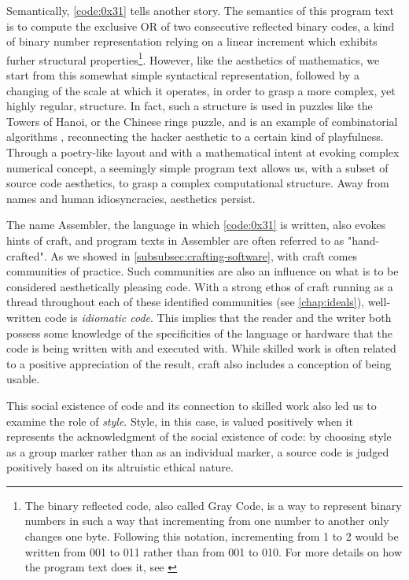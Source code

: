 Semantically, \ref{code:0x31} tells another story. The semantics of this program text is to compute the exclusive OR of two consecutive reflected binary codes, a kind of binary number representation relying on a linear increment which exhibits furher structural properties\footnote{The binary reflected code, also called Gray Code, is a way to represent binary numbers in such a way that incrementing from one number to another only changes one byte. Following this notation, incrementing from 1 to 2 would be written from 001 to 011 rather than from 001 to 010. For more details on how the program text does it, see \citep{sanchez_solutions_2016}}. However, like the aesthetics of mathematics, we start from this somewhat simple syntactical representation, followed by a changing of the scale at which it operates, in order to grasp a more complex, yet highly regular, structure. In fact, such a structure is used in puzzles like the Towers of Hanoi, or the Chinese rings puzzle, and is an example of combinatorial algorithms \citep{knuth_art_2011}, reconnecting the hacker aesthetic to a certain kind of playfulness. Through a poetry-like layout and with a mathematical intent at evoking complex numerical concept, a seemingly simple program text allows us, with a subset of source code aesthetics, to grasp a complex computational structure. Away from names and human idiosyncracies, aesthetics persist.

The name Assembler, the language in which \ref{code:0x31} is written, also evokes hints of craft, and program texts in Assembler are often referred to as "hand-crafted". As we showed in \ref{subsubsec:crafting-software}, with craft comes communities of practice. Such communities are also an influence on what is to be considered aesthetically pleasing code.  With a strong ethos of craft running as a thread throughout each of these identified communities (see \ref{chap:ideals}), well-written code is \emph{idiomatic code}. This implies that the reader and the writer both possess some knowledge of the specificities of the language or hardware that the code is being written with and executed with. While skilled work is often related to a positive appreciation of the result, craft also includes a conception of being usable.

This social existence of code and its connection to skilled work also led us to examine the role of \emph{style}. Style, in this case, is valued positively when it represents the acknowledgment of the social existence of code: by choosing style as a group marker rather than as an individual marker, a source code is judged positively based on its altruistic ethical nature.

